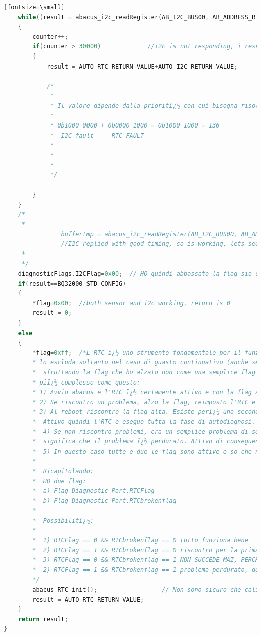 \documentclass[LaM,binding=0.6cm]{../sapthesis}
\begin{document}
\begin{lstlisting}[language=c][fontsize=\small]
    while((result = abacus_i2c_readRegister(AB_I2C_BUS00, AB_ADDRESS_RTC, BQ32000CAL_CFG1))==0x00)
    {
        counter++;
        if(counter > 30000)             //i2c is not responding, i reset, so i set both acc and i2c not working to be sure
        {
            result = AUTO_RTC_RETURN_VALUE+AUTO_I2C_RETURN_VALUE;

            /*
             *
             * Il valore dipende dalla prioritï¿½ con cui bisogna risolvere il problema: questo identifica che sia il bus IC che l'accelerometro sono non funzionanti:
             *
             * 0b1000 0000 + 0b0000 1000 = 0b1000 1000 = 136
             *  I2C fault     RTC FAULT
             *
             *
             *
             */

        }
    }
    /*
     *
                buffertmp = abacus_i2c_readRegister(AB_I2C_BUS00, AB_ADDRESS_RTC, BQ32000CAL_CFG1);
                //I2C replied with good timing, so is working, lets see if the ID is correct
     *
     */
    diagnosticFlags.I2CFlag=0x00;  // HO quindi abbassato la flag sia del sensore che del bus
    if(result==BQ32000_STD_CONFIG)
    {
        *flag=0x00;  //both sensor and i2c working, return is 0
        result = 0;
    }
    else
    {
        *flag=0xff;  /*L'RTC ï¿½ uno strumento fondamentale per il funzionamento del sistema. Bisogna creare un sistema che
        * lo escluda soltanto nel caso di guasto continuativo (anche se lo resetto). Questo potrebbe essere fatto
        *  sfruttando la flag che ho alzato non come una semplice flag che esclude direttamente al reset, ma con un sistema
        * piï¿½ complesso come questo:
        * 1) Avvio abacus e l'RTC ï¿½ certamente attivo e con la flag abbassata (a 0x0 )
        * 2) Se riscontro un problema, alzo la flag, reimposto l'RTC e rebootto.
        * 3) Al reboot riscontro la flag alta. Esiste perï¿½ una seconda flag che tiene conto se il problema ï¿½ perdurato e questa ï¿½ ancora bassa.
        *  Attivo quindi l'RTC e eseguo tutta la fase di autodiagnosi.
        *  4) Se non riscontro problemi, era un semplice problema di settaggi. Se riscontro nuovamente un problema (bus bloccato, config reg diverso)
        *  significa che il problema ï¿½ perdurato. Attivo di conseguenza la seconda flag (Sensor_broken_flag) e rebootto.
        *  5) In questo caso tutte e due le flag sono attive e so che non devo attivare l'RTC
        *
        *  Ricapitolando:
        *  HO due flag:
        *  a) Flag_Diagnostic_Part.RTCFlag
        *  b) Flag_Diagnostic_Part.RTCbrokenflag
        *
        *  Possibilitï¿½:
        *
        *  1) RTCFlag == 0 && RTCbrokenflag == 0 tutto funziona bene
        *  2) RTCFlag == 1 && RTCbrokenflag == 0 riscontro per la prima volta un problema
        *  3) RTCFlag == 0 && RTCbrokenflag == 1 NON SUCCEDE MAI, PERCHï¿½ IMPONGO CHE LA BROKEN FLAG SIA MODIFICABILE DOPO LA RTC FLAG
        *  2) RTCFlag == 1 && RTCbrokenflag == 1 problema perdurato, devo disattivare l'RTC
        */
        abacus_RTC_init();                  // Non sono sicuro che calibri in maniera giusta. Nella libreria sembra resettare tutto al 1 gennaio 2000
        result = AUTO_RTC_RETURN_VALUE;
    }
    return result;
}



\end{lstlisting}
\end{document}
